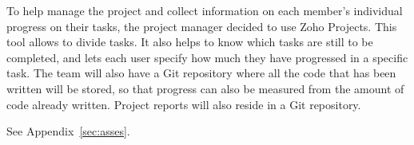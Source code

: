 
To help manage the project and collect information on each member's individual progress on their tasks, the project manager decided to use Zoho Projects. This tool allows to divide tasks. It also helps to know which tasks are still to be completed, and lets each user specify how much they have progressed in a specific task. The team will also have a Git repository where all the code that has been written will be stored, so that progress can also be measured from the amount of code already written. Project reports will also reside in a Git repository.

See Appendix~\ref{sec:asses}.